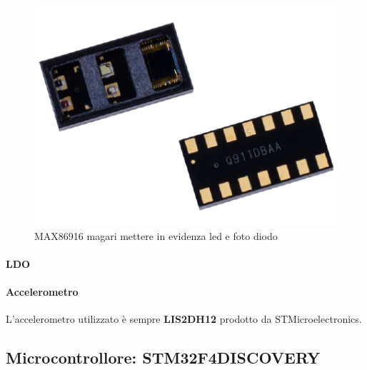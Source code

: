 \begin{figure}[tb]
	\centering
	\includegraphics[width=0.6\linewidth]{ImageFiles/Hardware/ImmagineMAX86916}
	\caption{MAX86916 magari mettere in evidenza led e foto diodo}
	\label{fig:ImmagineMAX86916}
\end{figure}

\paragraph{LDO} 

\paragraph{Accelerometro} L'accelerometro utilizzato è sempre \textbf{LIS2DH12} prodotto da STMicroelectronics.

\subsection{Microcontrollore: STM32F4DISCOVERY}
